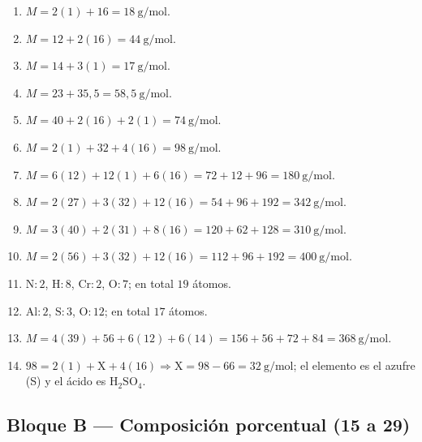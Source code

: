 \documentclass[12pt, letterpaper]{article}
\begin{document}
  \begin{enumerate}[leftmargin=*, label=\textbf{\arabic*.}, start=1]
    \item $M = 2(1) + 16 = 18\ \text{g/mol}$.
    \item $M = 12 + 2(16) = 44\ \text{g/mol}$.
    \item $M = 14 + 3(1) = 17\ \text{g/mol}$.
    \item $M = 23 + 35{,}5 = 58{,}5\ \text{g/mol}$.
    \item $M = 40 + 2(16) + 2(1) = 74\ \text{g/mol}$.
    \item $M = 2(1) + 32 + 4(16) = 98\ \text{g/mol}$.
    \item $M = 6(12) + 12(1) + 6(16) = 72 + 12 + 96 = 180\ \text{g/mol}$.
    \item $M = 2(27) + 3(32) + 12(16) = 54 + 96 + 192 = 342\ \text{g/mol}$.
    \item $M = 3(40) + 2(31) + 8(16) = 120 + 62 + 128 = 310\ \text{g/mol}$.
    \item $M = 2(56) + 3(32) + 12(16) = 112 + 96 + 192 = 400\ \text{g/mol}$.
    \item $\text{N}:2$, $\text{H}:8$, $\text{Cr}:2$, $\text{O}:7$; en total $19$ átomos.
    \item $\text{Al}:2$, $\text{S}:3$, $\text{O}:12$; en total $17$ átomos.
    \item $M = 4(39) + 56 + 6(12) + 6(14) = 156 + 56 + 72 + 84 = 368\ \text{g/mol}$.
    \item $98 = 2(1) + \text{X} + 4(16) \Rightarrow \text{X} = 98 - 66 = 32\ \text{g/mol}$; el elemento es el azufre (S) y el ácido es $\text{H}_2\text{SO}_4$.
  \end{enumerate}

  \subsection*{Bloque B — Composición porcentual (15 a 29)}
\end{document}
